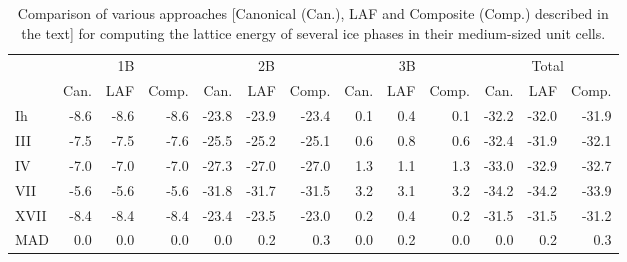 \begin{table}[h]

\caption{\label{tab:canonical_cheaper_medium}Comparison of various approaches [Canonical (Can.), LAF and Composite (Comp.) described in the text] for computing the lattice energy of several ice phases in their medium-sized unit cells.}
\begin{tabular}{lrrrrrrrrrrrr}
\toprule
 & \multicolumn{3}{c}{1B} & \multicolumn{3}{c}{2B} & \multicolumn{3}{c}{3B} & \multicolumn{3}{c}{Total} \\ \cmidrule(lr){2-4} \cmidrule(lr){5-7} \cmidrule(lr){8-10} \cmidrule(lr){11-13} 
 & Can. & LAF & Comp. & Can. & LAF & Comp. & Can. & LAF & Comp. & Can. & LAF & Comp. \\
\midrule
Ih & -8.6 & -8.6 & -8.6 & -23.8 & -23.9 & -23.4 & 0.1 & 0.4 & 0.1 & -32.2 & -32.0 & -31.9 \\
III & -7.5 & -7.5 & -7.6 & -25.5 & -25.2 & -25.1 & 0.6 & 0.8 & 0.6 & -32.4 & -31.9 & -32.1 \\
IV & -7.0 & -7.0 & -7.0 & -27.3 & -27.0 & -27.0 & 1.3 & 1.1 & 1.3 & -33.0 & -32.9 & -32.7 \\
VII & -5.6 & -5.6 & -5.6 & -31.8 & -31.7 & -31.5 & 3.2 & 3.1 & 3.2 & -34.2 & -34.2 & -33.9 \\
XVII & -8.4 & -8.4 & -8.4 & -23.4 & -23.5 & -23.0 & 0.2 & 0.4 & 0.2 & -31.5 & -31.5 & -31.2 \\
\midrule MAD & 0.0 & 0.0 & 0.0 & 0.0 & 0.2 & 0.3 & 0.0 & 0.2 & 0.0 & 0.0 & 0.2 & 0.3 \\
\bottomrule
\end{tabular}

\end{table}